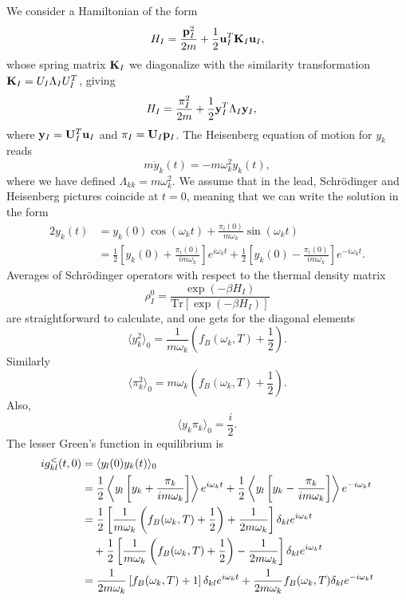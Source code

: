 We consider a Hamiltonian of the form
\begin{equation}
 H_I = \frac{\mathbf{p}_I^2}{2m} + \frac{1}{2} \mathbf{u}_I^T \mathbf{K}_I \mathbf{u}_I,
\end{equation}
whose spring matrix $\mathbf{K}_I$ we diagonalize with the similarity transformation $\mathbf{K}_I=U_I \Lambda_I U_I^T$, giving
\begin{alignat}{2}
  H_I&= \frac{\mathbf{\pi}_I^2}{2m} + \frac{1}{2} \mathbf{y}_I^T \Lambda_I \mathbf{y}_I,
\end{alignat}
where $\mathbf{y}_I=\mathbf{U}_I^T \mathbf{u}_I$ and $\pi_I=\mathbf{U}_I \mathbf{p}_I$. The Heisenberg equation of motion for $y_k$ reads
\begin{equation}
 m\ddot{y}_k(t) = - m \omega_k^2 y_k(t),
\end{equation}
where we have defined $\Lambda_{kk}=m\omega_k^2$. We assume that in the lead, Schr\"odinger and Heisenberg pictures coincide at $t=0$, meaning that we can write the solution in the form
\begin{alignat}{2}
 y_k(t) &= y_k(0) \cos(\omega_k t) + \frac{\pi_i(0)}{m\omega_k} \sin(\omega_k t) \\
  &= \frac{1}{2}\left[y_k(0) + \frac{\pi_i(0)}{i m\omega_k}\right] e^{i\omega_k t} + \frac{1}{2} \left[y_k(0) - \frac{\pi_i(0)}{i m\omega_k}\right] e^{-i\omega_k t}. 
\end{alignat}
Averages of Schr\"odinger operators with respect to the thermal density matrix 
\begin{equation}
\rho^0_I=\frac{\exp(-\beta H_I)}{\textrm{Tr}[\exp(-\beta H_I)]}
\end{equation}
are straightforward to calculate, and one gets for the diagonal elements
\begin{equation}
 \langle y_k^2 \rangle_0 =\frac{1}{m\omega_k} \left(f_B(\omega_k,T)+\frac{1}{2}\right).
\end{equation}
Similarly
\begin{equation}
 \langle \pi_k^2 \rangle_0 = m\omega_k \left(f_B(\omega_k,T)+\frac{1}{2}\right).
\end{equation}
Also,
\begin{equation}
 \langle y_k \pi_k \rangle_0 = \frac{i}{2}.
\end{equation}
The lesser Green's function in equilibrium is
\begin{alignat}{2}
 ig^<_{kl}(t,0) &= \langle y_l(0) y_k(t) \rangle_0 \\
  &= \frac{1}{2} \left\langle y_l \left[y_k + \frac{\pi_k}{i m\omega_k}\right] \right\rangle e^{i\omega_k t} + \frac{1}{2} \left\langle y_l \left[y_k - \frac{\pi_k}{i m\omega_k}\right] \right\rangle e^{-i\omega_k t}\\
  &=  \frac{1}{2}\left[ \frac{1}{m\omega_k} \left(f_B(\omega_k,T)+\frac{1}{2}\right) + \frac{1}{2m\omega_k}\right] \delta_{kl} e^{i\omega_k t} \notag \\
  &\quad + \frac{1}{2}\left[ \frac{1}{m\omega_k} \left(f_B(\omega_k,T)+\frac{1}{2}\right) - \frac{1}{2m\omega_k}\right] \delta_{kl} e^{i\omega_k t} \\
  &= \frac{1}{2m\omega_k} \left[f_B(\omega_k,T)+1 \right] \delta_{kl} e^{i\omega_k t} +  \frac{1}{2m\omega_k} f_B(\omega_k,T) \delta_{kl} e^{-i\omega_k t}
\end{alignat}
